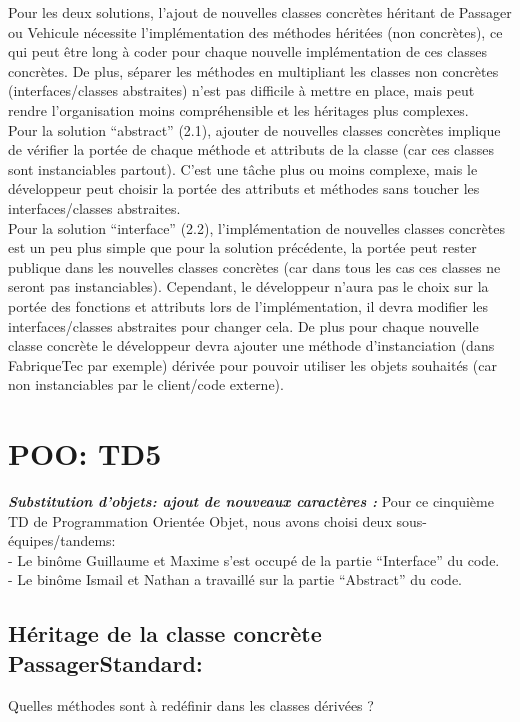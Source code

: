 \documentclass{article}
\begin{document}
Pour les deux solutions, l’ajout de nouvelles classes concrètes héritant de Passager ou
Vehicule nécessite l’implémentation des méthodes héritées (non concrètes), ce qui peut
être long à coder pour chaque nouvelle implémentation de ces classes concrètes.
De plus, séparer les méthodes en multipliant les classes non concrètes (interfaces/classes abstraites) n’est pas difficile à mettre en place, mais peut rendre l’organisation moins compréhensible et les héritages plus complexes.\\

Pour la solution “abstract” (2.1), ajouter de nouvelles classes concrètes implique de vérifier la portée de chaque méthode et attributs de la classe (car ces classes sont instanciables partout). C’est une tâche plus ou moins complexe, mais le développeur peut choisir la portée des attributs et méthodes sans toucher les interfaces/classes abstraites.
\\
Pour la solution “interface” (2.2), l’implémentation de nouvelles classes concrètes est un peu plus simple que pour la solution précédente, la portée peut rester publique dans les nouvelles classes concrètes (car dans tous les cas ces classes ne seront pas instanciables). Cependant, le développeur n’aura pas le choix sur la portée des fonctions et attributs lors de l’implémentation, il devra modifier les interfaces/classes abstraites pour changer cela.
De plus pour chaque nouvelle classe concrète le développeur devra ajouter une méthode
d’instanciation (dans FabriqueTec par exemple) dérivée pour pouvoir utiliser les objets
souhaités (car non instanciables par le client/code externe).
\section{POO: TD5}
\textbf{\textit{    Substitution d'objets: ajout de nouveaux caractères : }}
Pour ce cinquième TD de Programmation Orientée Objet, nous avons choisi deux
sous-équipes/tandems:\\
- Le binôme Guillaume et Maxime s’est occupé de la partie “Interface” du code.\\
- Le binôme Ismail et Nathan a travaillé sur la partie “Abstract” du code.
\subsection{Héritage de la classe concrète PassagerStandard: }
Quelles méthodes sont à redéfinir dans les classes dérivées ?\\
\end{document}
